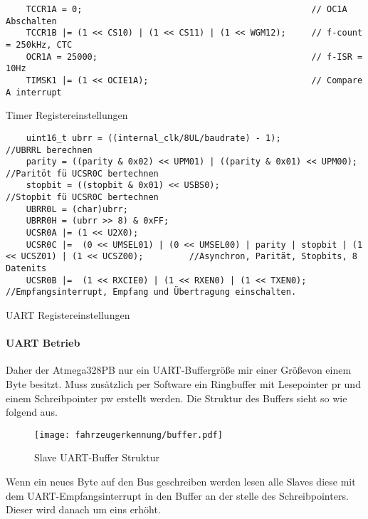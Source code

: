 \begin{listing}[H]
    \begin{verbatim}
    TCCR1A = 0;                                             // OC1A Abschalten
    TCCR1B |= (1 << CS10) | (1 << CS11) | (1 << WGM12);     // f-count = 250kHz, CTC
    OCR1A = 25000;                                          // f-ISR = 10Hz
    TIMSK1 |= (1 << OCIE1A);                                // Compare A interrupt
    \end{verbatim}
    \caption{Timer Registereinstellungen}
\end{listing}


\begin{listing}[H]
    \begin{verbatim}
    uint16_t ubrr = ((internal_clk/8UL/baudrate) - 1);                      //UBRRL berechnen
    parity = ((parity & 0x02) << UPM01) | ((parity & 0x01) << UPM00);       //Paritöt fü UCSR0C bertechnen
    stopbit = ((stopbit & 0x01) << USBS0);                                  //Stopbit fü UCSR0C bertechnen
    UBRR0L = (char)ubrr;
    UBRR0H = (ubrr >> 8) & 0xFF;
    UCSR0A |= (1 << U2X0);
    UCSR0C |=  (0 << UMSEL01) | (0 << UMSEL00) | parity | stopbit | (1 << UCSZ01) | (1 << UCSZ00);         //Asynchron, Parität, Stopbits, 8 Datenits
    UCSR0B |=  (1 << RXCIE0) | (1 << RXEN0) | (1 << TXEN0);                 //Empfangsinterrupt, Empfang und Übertragung einschalten.      
    \end{verbatim}
    \caption{UART Registereinstellungen}
\end{listing}



\paragraph{UART Betrieb}\mbox{} 

Daher der Atmega328PB nur ein UART-Buffergröße mir einer Größevon einem Byte besitzt. Muss
zusätzlich per Software ein Ringbuffer mit Lesepointer pr und einem Schreibpointer pw erstellt
werden. Die Struktur des Buffers sieht so wie folgend aus.

\begin{figure}[H]
    \centering
    \texttt{[image: fahrzeugerkennung/buffer.pdf]}
    \caption{Slave UART-Buffer Struktur}
\end{figure}

Wenn ein neues Byte auf den Bus geschreiben werden lesen alle Slaves diese mit dem UART-Empfangsinterrupt in den Buffer an der stelle des Schreibpointers. Dieser wird danach um eins
erhöht.


